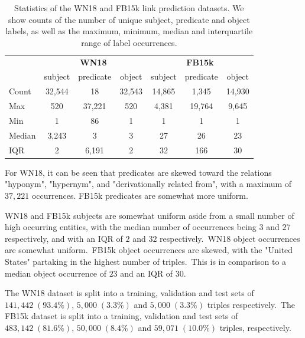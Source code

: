 \begin{table}[H]
	\begin{center}
	\begin{tabular}{|l|ccc|ccc|}
		\hline
 		& \multicolumn{3}{c|}{\textbf{WN18}} & \multicolumn{3}{c|}{\textbf{FB15k}} \\
		& subject & predicate & object & subject & predicate & object \\
		\hline 
		Count & 32,544 & 18 & 32,543 & 14,865 & 1,345 & 14,930 \\
		Max & 520 & 37,221 & 520 & 4,381 & 19,764 & 9,645 \\
		Min & 1 & 86 & 1 & 1 & 1 & 1 \\
		Median & 3,243 & 3 & 3 & 27 & 26 & 23 \\
		IQR & 2 & 6,191 & 2 & 32 & 166 & 30 \\
		\hline 
	\end{tabular}
	\end{center}
	\captionsetup{justification=centering}
	\caption{Statistics of the WN18 and FB15k link prediction datasets. We show counts of the number of unique subject, predicate and object labels, as well as the maximum, minimum, median and interquartile range of label occurrences.}
\end{table}

\noindent For WN18, it can be seen that predicates are skewed toward the relations "hyponym",  "hypernym", and "derivationally related from", with a maximum of $ 37, 221 $ occurrences. FB15k predicates are somewhat more uniform. \par

\noindent WN18 and FB15k subjects are somewhat uniform aside from a small number of high occurring entities, with the median number of occurrences being $ 3 $ and $ 27 $ respectively, and with an IQR of $ 2 $ and $ 32 $ respectively.\ WN18 object occurrences are somewhat uniform.\ FB15k object occurrences are skewed, with the "United States" partaking in the highest number of triples.\ This is in comparison to a median object occurrence of $ 23 $ and an IQR of 30. \par

\noindent The WN18 dataset is split into a training, validation and test sets of $ 141, 442 \; (93.4 \%) $, $ 5, 000 \; (3.3 \%) $ and $ 5, 000 \; (3.3 \%) $ triples respectively.\ The FB15k dataset is split into a training, validation and test sets of $ 483, 142 \; (81.6 \%) $, $ 50, 000 \; (8.4 \%) $ and $ 59, 071 \; (10.0 \%) $ triples, respectively. 


